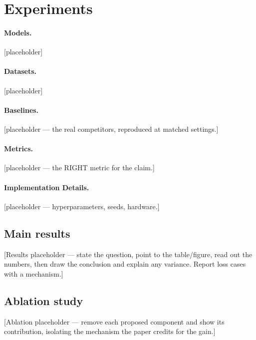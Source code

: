 \section{Experiments}
\label{sec:results}

\paragraph{Models.} [placeholder]
\paragraph{Datasets.} [placeholder]
\paragraph{Baselines.} [placeholder — the real competitors, reproduced at matched settings.]
\paragraph{Metrics.} [placeholder — the RIGHT metric for the claim.]
\paragraph{Implementation Details.} [placeholder — hyperparameters, seeds, hardware.]

\subsection{Main results}
\label{sec:results-main}
[Results placeholder — state the question, point to the table/figure, read out the numbers, then draw the
conclusion and explain any variance. Report loss cases with a mechanism.]

\subsection{Ablation study}
\label{sec:results-ablation}
[Ablation placeholder — remove each proposed component and show its contribution, isolating the mechanism
the paper credits for the gain.]
